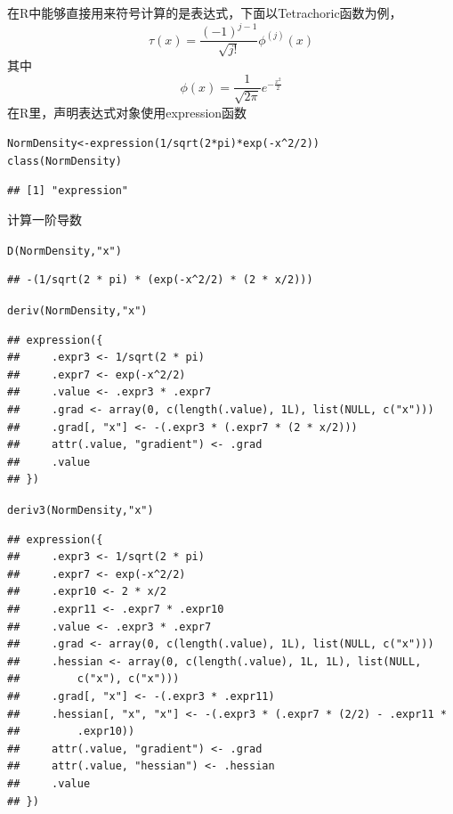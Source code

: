 \documentclass[a4paper]{ctexart}\usepackage[]{graphicx}\usepackage[]{color}
\makeatletter
\newcommand{\hlnum}[1]{\textcolor[rgb]{0.502,0.086,1}{#1}}%
\newcommand{\hlstr}[1]{\textcolor[rgb]{1,0.4,0.2}{#1}}%
\newcommand{\hlopt}[1]{\textcolor[rgb]{0.251,0.251,0.251}{#1}}%
\newcommand{\hlstd}[1]{\textcolor[rgb]{0.251,0.251,0.251}{#1}}%
\newcommand{\hlkwb}[1]{\textcolor[rgb]{0,0.439,0.902}{#1}}%
\newcommand{\hlkwd}[1]{\textcolor[rgb]{0.69,0.188,0.941}{#1}}%
\newenvironment{kframe}{%
 \def\at@end@of@kframe{}%
 \ifinner\ifhmode%
  \def\at@end@of@kframe{\end{minipage}}%
  \begin{minipage}{\columnwidth}%
 \fi\fi%
 \def\FrameCommand##1{\hskip\@totalleftmargin \hskip-\fboxsep
 \colorbox{shadecolor}{##1}\hskip-\fboxsep
     \hskip-\linewidth \hskip-\@totalleftmargin \hskip\columnwidth}%
 \MakeFramed {\advance\hsize-\width
   \@totalleftmargin\z@ \linewidth\hsize
   \@setminipage}}%
 {\par\unskip\endMakeFramed%
 \at@end@of@kframe}
\newenvironment{knitrout}{}{} %
\makeatother
\begin{document}
在R中能够直接用来符号计算的是表达式，下面以Tetrachoric函数为例，
$$\tau(x)=\frac{(-1)^{j-1}}{\sqrt{j !}}\phi^{(j)}(x)$$
其中
$$\phi(x)=\frac{1}{\sqrt{2\pi}}e^{-\frac{x^2}{2}}$$
在R里，声明表达式对象使用expression函数
\begin{knitrout}
\color{fgcolor}\begin{kframe}
\begin{alltt}
\hlstd{NormDensity}\hlkwb{<-}\hlkwd{expression}\hlstd{(}\hlnum{1}\hlopt{/}\hlkwd{sqrt}\hlstd{(}\hlnum{2}\hlopt{*}\hlstd{pi)}\hlopt{*}\hlkwd{exp}\hlstd{(}\hlopt{-}\hlstd{x}\hlopt{^}\hlnum{2}\hlopt{/}\hlnum{2}\hlstd{))}
\hlkwd{class}\hlstd{(NormDensity)}
\end{alltt}
\begin{verbatim}
## [1] "expression"
\end{verbatim}
\end{kframe}
\end{knitrout}
计算一阶导数
\begin{knitrout}
\color{fgcolor}\begin{kframe}
\begin{alltt}
\hlkwd{D}\hlstd{(NormDensity,}\hlstr{"x"}\hlstd{)}
\end{alltt}
\begin{verbatim}
## -(1/sqrt(2 * pi) * (exp(-x^2/2) * (2 * x/2)))
\end{verbatim}
\begin{alltt}
\hlkwd{deriv}\hlstd{(NormDensity,}\hlstr{"x"}\hlstd{)}
\end{alltt}
\begin{verbatim}
## expression({
##     .expr3 <- 1/sqrt(2 * pi)
##     .expr7 <- exp(-x^2/2)
##     .value <- .expr3 * .expr7
##     .grad <- array(0, c(length(.value), 1L), list(NULL, c("x")))
##     .grad[, "x"] <- -(.expr3 * (.expr7 * (2 * x/2)))
##     attr(.value, "gradient") <- .grad
##     .value
## })
\end{verbatim}
\begin{alltt}
\hlkwd{deriv3}\hlstd{(NormDensity,}\hlstr{"x"}\hlstd{)}
\end{alltt}
\begin{verbatim}
## expression({
##     .expr3 <- 1/sqrt(2 * pi)
##     .expr7 <- exp(-x^2/2)
##     .expr10 <- 2 * x/2
##     .expr11 <- .expr7 * .expr10
##     .value <- .expr3 * .expr7
##     .grad <- array(0, c(length(.value), 1L), list(NULL, c("x")))
##     .hessian <- array(0, c(length(.value), 1L, 1L), list(NULL, 
##         c("x"), c("x")))
##     .grad[, "x"] <- -(.expr3 * .expr11)
##     .hessian[, "x", "x"] <- -(.expr3 * (.expr7 * (2/2) - .expr11 * 
##         .expr10))
##     attr(.value, "gradient") <- .grad
##     attr(.value, "hessian") <- .hessian
##     .value
## })
\end{verbatim}
\end{kframe}
\end{knitrout}
\end{document}
